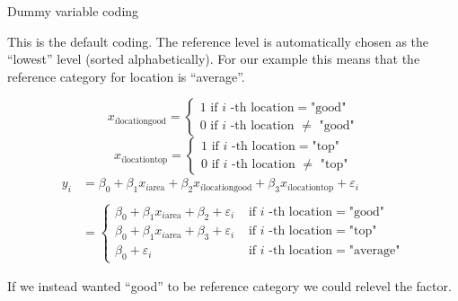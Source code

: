 \documentclass[10pt,ignorenonframetext,]{beamer}
\begin{document}
\begin{frame}

\begin{block}{Dummy variable coding}

This is the default coding. The reference level is automatically chosen
as the ``lowest'' level (sorted alphabetically). For our example this
means that the reference category for location is ``average''.

\[x_{i \text{locationgood}} = \begin{cases} 1 \text{ if } i \text{ -th location}=\text{"good"} \\ 0 \text{ if } i \text{ -th location }\neq\text{ "good"} \end{cases}\]
\[x_{i \text{locationtop}} = \begin{cases} 1 \text{ if } i \text{ -th location}=\text{"top"} \\ 0 \text{ if } i \text{ -th location }\neq\text{ "top"} \end{cases}\]
\[\begin{aligned} y_i &= \beta_0 + \beta_1 x_{i \text{area}} + \beta_2 x_{i \text{locationgood}}+\beta_3 x_{i \text{locationtop}} + \varepsilon_i\\\\ &= \begin{cases} \beta_0 + \beta_1 x_{i \text{area}}+ \beta_2 + \varepsilon_i  &\text{ if } i \text{ -th location}=\text{"good"}  \\ \beta_0 + \beta_1 x_{i \text{area}}+ \beta_3 + \varepsilon_i &\text{ if } i \text{ -th location}=\text{"top"} \\ \beta_0 + \varepsilon_i &\text{ if } i \text{ -th location}=\text{"average"}\end{cases}\end{aligned}\]

If we instead wanted ``good'' to be reference category we could relevel
the factor.

\end{block}

\end{frame}
\end{document}

